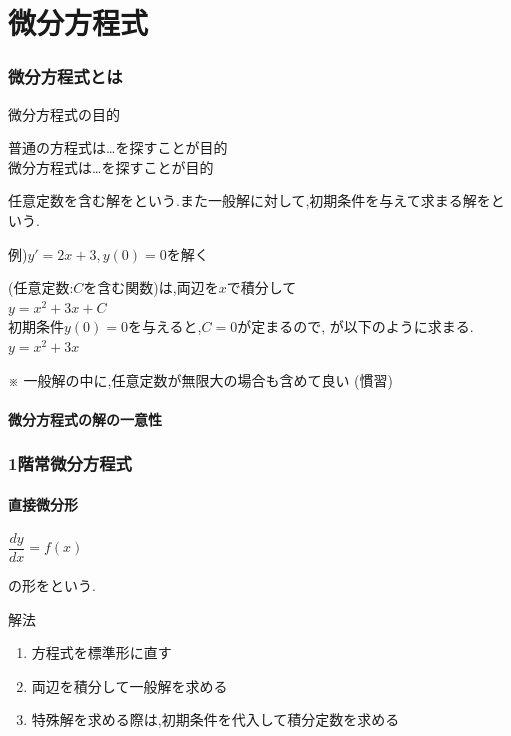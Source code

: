 \documentclass[a4paper]{jsarticle}
\begin{document}
\part{微分方程式}
\section{微分方程式とは}
\begin{itembox}[l]{微分方程式の目的}
    \begin{center}
        普通の方程式は\dots\qquad{}を探すことが目的\\
        微分方程式は\dots\qquad{}を探すことが目的
    \end{center}
\end{itembox}
任意定数を含む解をという.また一般解に対して,初期条件を与えて求まる解をという.
\begin{itembox}[l]{例)\quad$y'=2x+3,y\left(0\right)=0$を解く}
    \begin{center}
        (任意定数:$C$を含む関数)は,両辺を$x$で積分して\\
        $y=x^2+3x+C$\\
        初期条件$y\left(0\right)=0$を与えると,$C=0$が定まるので,
        が以下のように求まる.\\
        $y=x^2+3x$
    \end{center}
\end{itembox}
※ 一般解の中に,任意定数が無限大の場合も含めて良い (慣習)
\subsection{微分方程式の解の一意性}
\section{1階常微分方程式}
\subsection{直接微分形}
\begin{center}
    $\dfrac{dy}{dx}=f\left(x\right)$
\end{center}
の形をという.
\begin{itembox}[l]{解法}
    \begin{enumerate}[(1)]
        \item 方程式を標準形に直す
        \item 両辺を積分して一般解を求める
        \item 特殊解を求める際は,初期条件を代入して積分定数を求める
    \end{enumerate}
\end{itembox}
\end{document}
